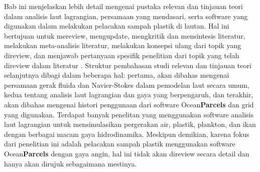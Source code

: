 \vspace{1.5pc}
\begin{spacing}{1.5}
	
	Bab ini menjelaskan lebih detail mengenai pustaka relevan dan tinjauan teori dalam analisis laut lagrangian, persamaan yang mendasari, serta software yang digunakan dalam melakukan pelacakan sampah plastik di lautan. Hal ini bertujuan untuk mereview, mengupdate, mengkritik dan mensintesis literatur, melakukan meta-analisis literatur, melakukan konsepsi ulang dari topik yang direview, dan menjawab pertanyaan spesifik penelitian dari topik yang telah direview dalam literatur . Struktur pembahasan studi relevan dan tinjauan teori selanjutnya dibagi dalam beberapa hal: pertama, akan dibahas mengenai persamaan gerak fluida dan Navier-Stokes dalam pemodelan laut secara umum, kedua tentang analisis laut lagrangian dan gaya yang berpengaruh, dan terakhir, akan dibahas mengenai histori penggunaan dari software Ocean\textbf{Parcels} dan grid yang digunakan. Terdapat banyak penelitan yang menggunakan software analisis laut lagrangian untuk mensimulasikan pergerakan air, plastik, plankton, dan ikan dengan berbagai macam gaya hidrodinamika. Meskipun demikian, karena fokus dari penelitian ini adalah pelacakan sampah plastik menggunakan software Ocean\textbf{Parcels} dengan gaya angin, hal ini tidak akan direview secara detail dan hanya akan dirujuk sebagaimana mestinya.
	
	
\end{spacing}
\vspace{-0.1pc}
